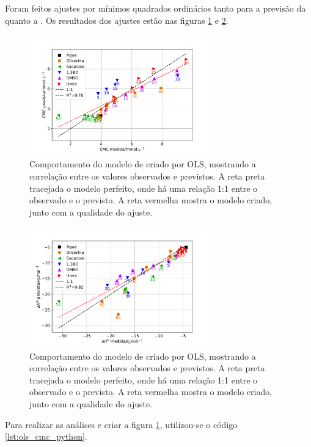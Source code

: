 		Foram feitos ajustes por mínimos quadrados ordinários tanto para a previsão da \cmc{} quanto a \DHmic. Os resultados dos ajustes estão nas figuras \ref{fig:ols_cmc_python} e \ref{fig:ols_dh_python}.
		
		\begin{figure}[h]
			\centering
			\includegraphics[width=0.7\textwidth]{imagens/itc/ols_cmc_python}
			\caption{Comportamento do modelo de \cmc{} criado por OLS, mostrando a correlação entre os valores observados e previstos. A reta preta tracejada o modelo perfeito, onde há uma relação 1:1 entre o observado e o previsto. A reta vermelha mostra o modelo criado, junto com a qualidade do ajuste.}
			\label{fig:ols_cmc_python}
		\end{figure}
		
		\begin{figure}[h]
			\centering
			\includegraphics[width=0.7\textwidth]{imagens/itc/ols_dh_python}
			\caption{Comportamento do modelo de \DHmic{} criado por OLS, mostrando a correlação entre os valores observados e previstos. A reta preta tracejada o modelo perfeito, onde há uma relação 1:1 entre o observado e o previsto. A reta vermelha mostra o modelo criado, junto com a qualidade do ajuste.}
			\label{fig:ols_dh_python}
		\end{figure}

		Para realizar as análises e criar a figura \ref{fig:ols_cmc_python}, utilizou-se o código \ref{lst:ols_cmc_python}.
		
